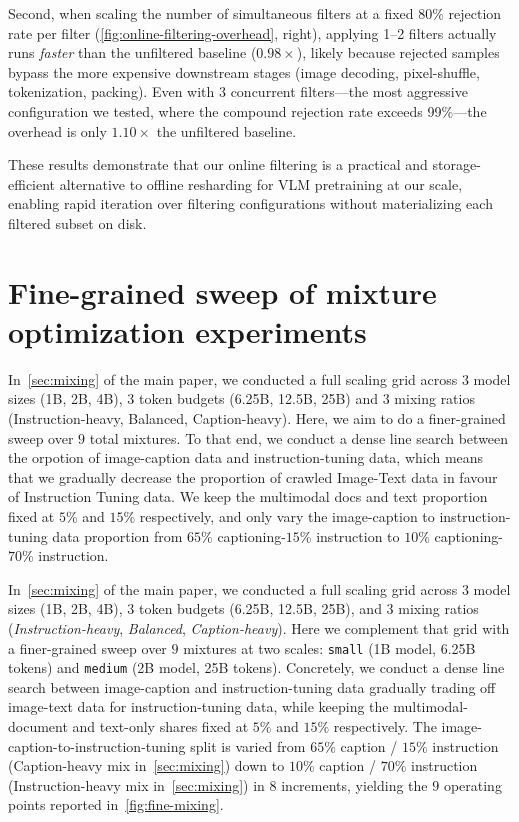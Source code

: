 Second, when scaling the number of simultaneous filters at a fixed 80\% rejection rate per filter (\cref{fig:online-filtering-overhead}, right), applying 1--2 filters actually runs \emph{faster} than the unfiltered baseline ($0.98\times$), likely because rejected samples bypass the more expensive downstream stages (image decoding, pixel-shuffle, tokenization, packing).
Even with 3 concurrent filters---the most aggressive configuration we tested, where the compound rejection rate exceeds 99\%---the overhead is only $1.10\times$ the unfiltered baseline.

These results demonstrate that our online filtering is a practical and storage-efficient alternative to offline resharding for VLM pretraining at our scale, enabling rapid iteration over filtering configurations without materializing each filtered subset on disk.
\clearpage


\section{Fine-grained sweep of mixture optimization experiments}\label{app:data-mixing-fine-sweep}


In~\cref{sec:mixing} of the main paper, we conducted a full scaling grid across $3$ model sizes (1B, 2B, 4B), $3$ token budgets (6.25B, 12.5B, 25B) and $3$ mixing ratios (Instruction-heavy, Balanced, Caption-heavy). Here, we aim to do a finer-grained sweep over $9$ total mixtures. 
To that end, we conduct a dense line search between the orpotion of image-caption data and instruction-tuning data, which means that we gradually decrease the proportion of crawled Image-Text data in favour of Instruction Tuning data. We keep the multimodal docs and text proportion fixed at $5$\% and $15$\% respectively, and only vary the image-caption to instruction-tuning data proportion from $65$\% captioning-$15$\% instruction to $10$\% captioning-$70$\% instruction.

In~\cref{sec:mixing} of the main paper, we conducted a full scaling grid across $3$ model sizes (1B, 2B, 4B), $3$ token budgets (6.25B, 12.5B, 25B), and $3$ mixing ratios (\textit{Instruction-heavy}, \textit{Balanced}, \textit{Caption-heavy}). Here we complement that grid with a finer-grained sweep over $9$ mixtures at two scales: \texttt{small} (1B model, 6.25B tokens) and \texttt{medium} (2B model, 25B tokens). Concretely, we conduct a dense line search between image-caption and instruction-tuning data gradually trading off image-text data for instruction-tuning data, while keeping the multimodal-document and text-only shares fixed at $5\%$ and $15\%$ respectively. The image-caption-to-instruction-tuning split is varied from $65\%$ caption / $15\%$ instruction (Caption-heavy mix in~\cref{sec:mixing}) down to $10\%$ caption / $70\%$ instruction (Instruction-heavy mix in~\cref{sec:mixing}) in 8 increments, yielding the $9$ operating points reported in~\cref{fig:fine-mixing}.

